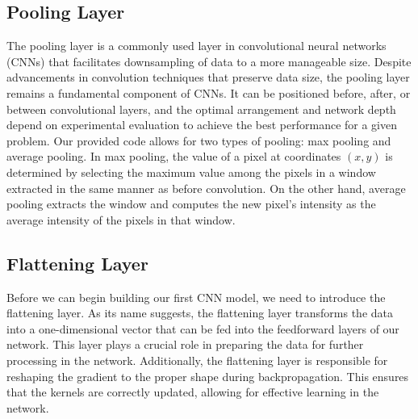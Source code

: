 \documentclass[onecolumn,10pt,cleanfoot]{asme2ej}
\begin{document}
\subsection{Pooling Layer}
The pooling layer is a commonly used layer in convolutional neural networks (CNNs) that facilitates downsampling of data to a more manageable size. Despite advancements in convolution techniques that preserve data size, the pooling layer remains a fundamental component of CNNs. It can be positioned before, after, or between convolutional layers, and the optimal arrangement and network depth depend on experimental evaluation to achieve the best performance for a given problem. Our provided code allows for two types of pooling: max pooling and average pooling. In max pooling, the value of a pixel at coordinates $(x,y)$ is determined by selecting the maximum value among the pixels in a window extracted in the same manner as before convolution. On the other hand, average pooling extracts the window and computes the new pixel's intensity as the average intensity of the pixels in that window.

\subsection{Flattening Layer}
Before we can begin building our first CNN model, we need to introduce the flattening layer. As its name suggests, the flattening layer transforms the data into a one-dimensional vector that can be fed into the feedforward layers of our network. This layer plays a crucial role in preparing the data for further processing in the network. Additionally, the flattening layer is responsible for reshaping the gradient to the proper shape during backpropagation. This ensures that the kernels are correctly updated, allowing for effective learning in the network.
\end{document}
